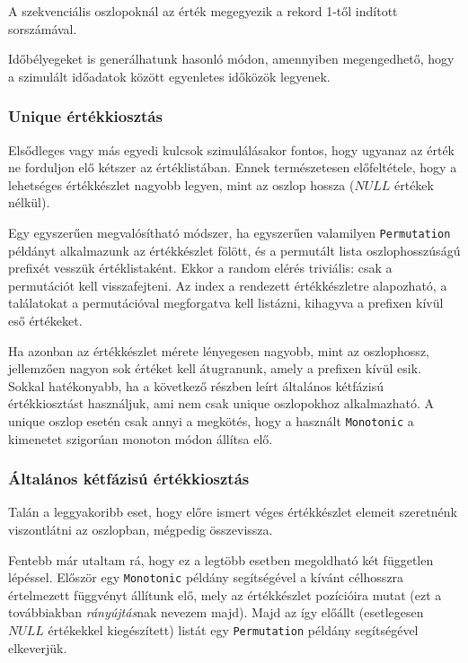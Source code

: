 \documentclass[
    parspace,
    noindent,
    nohyp,
]{elteiktdk}[2023/04/10]
\begin{document}
A szekvenciális oszlopoknál az érték megegyezik a rekord 1-től indított sorszámával.

Időbélyegeket is generálhatunk hasonló módon,
amennyiben megengedhető, hogy a szimulált időadatok között egyenletes időközök legyenek.

\subsubsection{Unique értékkiosztás}

Elsődleges vagy más egyedi kulcsok szimulálásakor fontos,
hogy ugyanaz az érték ne forduljon elő kétszer az értéklistában.
Ennek természetesen előfeltétele,
hogy a lehetséges értékkészlet nagyobb legyen, mint az oszlop hossza
($NULL$ értékek nélkül).

Egy egyszerűen megvalósítható módszer,
ha egyszerűen valamilyen \texttt{Permutation} példányt alkalmazunk az értékkészlet fölött,
és a permutált lista oszlophosszúságú prefixét vesszük értéklistaként.
Ekkor a random elérés triviális: csak a permutációt kell visszafejteni.
Az index a rendezett értékkészletre alapozható,
a találatokat a permutációval megforgatva kell listázni,
kihagyva a prefixen kívül eső értékeket.

Ha azonban az értékkészlet mérete lényegesen nagyobb, mint az oszlophossz,
jellemzően nagyon sok értéket kell átugranunk, amely a prefixen kívül esik.
Sokkal hatékonyabb, ha a következő részben leírt általános kétfázisú értékkiosztást használjuk,
ami nem csak unique oszlopokhoz alkalmazható.
A unique oszlop esetén csak annyi a megkötés, hogy a használt \texttt{Monotonic}
a kimenetet szigorúan monoton módon állítsa elő.

\subsubsection{Általános kétfázisú értékkiosztás}

Talán a leggyakoribb eset,
hogy előre ismert véges értékkészlet elemeit szeretnénk viszontlátni az oszlopban,
mégpedig összevissza.

Fentebb már utaltam rá, hogy ez a legtöbb esetben megoldható két független lépéssel.
Először egy \texttt{Monotonic} példány segítségével a kívánt célhosszra
értelmezett függvényt állítunk elő, mely az értékkészlet pozícióira mutat
(ezt a továbbiakban \textit{rányújtás}nak nevezem majd).
Majd az így előállt (esetlegesen $NULL$ értékekkel kiegészített) listát
egy \texttt{Permutation} példány segítségével elkeverjük.
\end{document}
